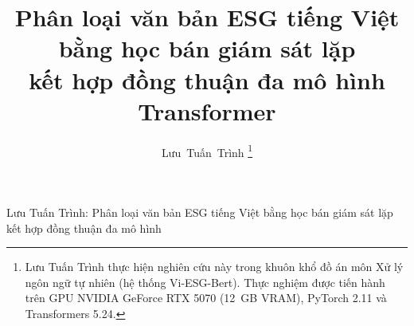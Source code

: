 \documentclass[journal,a4paper]{IEEEtran}
\begin{document}
\title{Phân loại văn bản ESG tiếng Việt bằng học bán giám sát lặp\\
kết hợp đồng thuận đa mô hình Transformer}

\author{Lưu~Tuấn~Trình%
\thanks{Lưu Tuấn Trình thực hiện nghiên cứu này trong khuôn khổ đồ án môn Xử lý ngôn ngữ tự nhiên (hệ thống Vi-ESG-Bert). Thực nghiệm được tiến hành trên GPU NVIDIA GeForce RTX 5070 (12~GB VRAM), PyTorch 2.11 và Transformers 5.24.}}

%
{Lưu Tuấn Trình: Phân loại văn bản ESG tiếng Việt bằng học bán giám sát lặp kết hợp đồng thuận đa mô hình}

\maketitle
\end{document}
